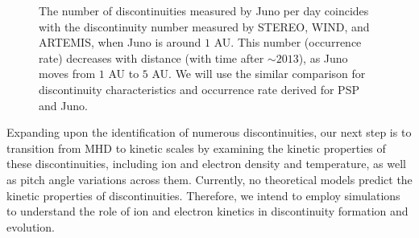 \documentclass[
  letterpaper,
  DIV=11,
  numbers=noendperiod]{scrartcl}
\begin{document}
\begin{figure}


\caption{\label{fig-rate}The number of discontinuities measured by Juno per day coincides with the discontinuity number measured by STEREO, WIND, and ARTEMIS, when Juno is around \(1\) AU. This number (occurrence rate) decreases with distance (with time after \(\sim 2013\)), as Juno moves from \(1\) AU to \(5\) AU. We will use the similar comparison for discontinuity characteristics and occurrence rate derived for PSP and Juno.}

\end{figure}%

Expanding upon the identification of numerous discontinuities, our next step is to transition from MHD to kinetic scales by examining the kinetic properties of these discontinuities, including ion and electron density and temperature, as well as pitch angle variations across them. Currently, no theoretical models predict the kinetic properties of discontinuities. Therefore, we intend to employ simulations to understand the role of ion and electron kinetics in discontinuity formation and evolution.
\end{document}
